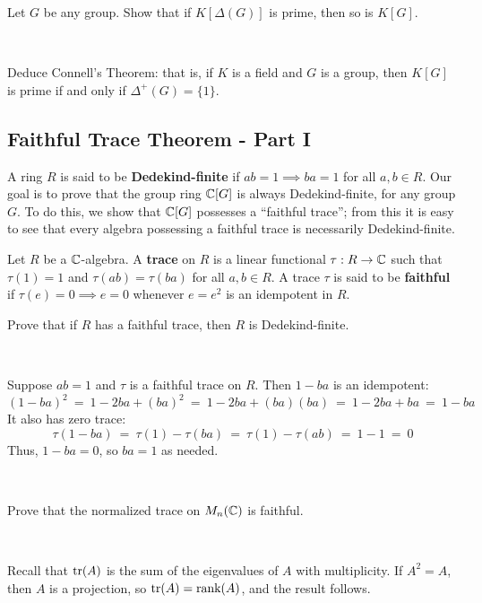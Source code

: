 \begin{exr}
	Let $G$ be any group.
	Show that if $K[\Delta(G)]$ is prime, then so is $K[G]$.
\end{exr} \

\begin{exr}
	Deduce Connell's Theorem: that is,
	if $K$ is a field and $G$ is a group, then $K[G]$ is prime
	if and only if $\Delta^+(G)=\{1\}$.
\end{exr}


\newpage
\subsection{Faithful Trace Theorem - Part I}
A ring $R$ is said to be \textbf{Dedekind-finite} if $ab=1\implies ba=1$ for all $a,b\in R$.
Our goal is to prove that the group ring $\mathbb{C}[G]$ is always Dedekind-finite, for any group $G$.
To do this, we show that $\mathbb{C}[G]$ possesses a ``faithful trace'';
from this it is easy to see that every algebra possessing a faithful trace is necessarily Dedekind-finite.

Let $R$ be a $\mathbb{C}$-algebra.
A \textbf{trace} on $R$ is a linear functional $\tau:R\rightarrow \mathbb{C}$ such that
$\tau(1)=1$ and $\tau(ab)=\tau(ba)$ for all $a,b\in R$.
A trace $\tau$ is said to be \textbf{faithful} if $\tau(e)=0\implies e=0$ whenever
$e=e^2$ is an idempotent in $R$.

\begin{exr}
	Prove that if $R$ has a faithful trace, then $R$ is Dedekind-finite.
\end{exr} \

\begin{pf}
	Suppose $ab=1$ and $\tau$ is a faithful trace on $R$.
	Then $1-ba$ is an idempotent:
	\begin{equation*}
		(1-ba)^{2} \ = \ 1-2ba+(ba)^{2} \ = \ 1-2ba+(ba)(ba) \ = \ 1-2ba+ba \ = \ 1-ba
	\end{equation*}
	It also has zero trace:
	\begin{equation*}
		\tau(1-ba) \ = \ \tau(1)-\tau(ba) \ = \ \tau(1)-\tau(ab) \ = \ 1-1 \ = \ 0
	\end{equation*}
	Thus, $1-ba=0$, so $ba=1$ as needed.
\end{pf} \

\begin{exr}
	Prove that the normalized trace on $M_n(\mathbb{C})$ is faithful.
\end{exr} \

\begin{pf}
	Recall that $\textrm{tr}(A)$ is the sum of the eigenvalues of $A$ with multiplicity.
	If $A^{2}=A$, then $A$ is a projection, so $\textrm{tr}(A)=\textrm{rank}(A)$,
	and the result follows.
\end{pf} \

